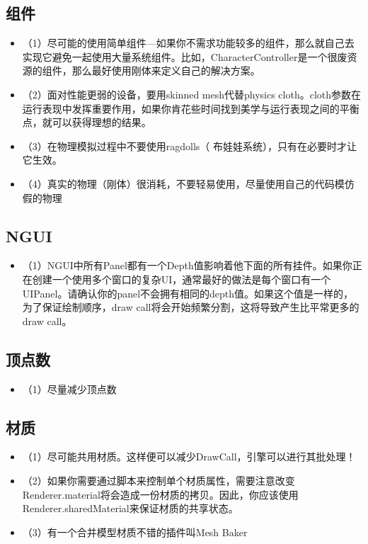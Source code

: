 \documentclass[9pt, b5paper]{article}
\begin{document}
\subsection{组件}
\label{sec:orgb42a9dc}
\begin{itemize}
\item （1）尽可能的使用简单组件—如果你不需求功能较多的组件，那么就自己去实现它避免一起使用大量系统组件。比如，CharacterController是一个很废资源的组件，那么最好使用刚体来定义自己的解决方案。
\item （2）面对性能更弱的设备，要用skinned mesh代替physics cloth。cloth参数在运行表现中发挥重要作用，如果你肯花些时间找到美学与运行表现之间的平衡点，就可以获得理想的结果。
\item （3）在物理模拟过程中不要使用ragdolls（ 布娃娃系统），只有在必要时才让它生效。
\item （4）真实的物理（刚体）很消耗，不要轻易使用，尽量使用自己的代码模仿假的物理
\end{itemize}
\subsection{NGUI}
\label{sec:org77c7aa5}
\begin{itemize}
\item （1）NGUI中所有Panel都有一个Depth值影响着他下面的所有挂件。如果你正在创建一个使用多个窗口的复杂UI，通常最好的做法是每个窗口有一个UIPanel。请确认你的panel不会拥有相同的depth值。如果这个值是一样的，为了保证绘制顺序，draw call将会开始频繁分割，这将导致产生比平常更多的draw call。
\end{itemize}
\subsection{顶点数}
\label{sec:orga6e4d55}
\begin{itemize}
\item （1）尽量减少顶点数
\end{itemize}
\subsection{材质}
\label{sec:org7c0f710}
\begin{itemize}
\item （1）尽可能共用材质。这样便可以减少DrawCall，引擎可以进行其批处理！
\item （2）如果你需要通过脚本来控制单个材质属性，需要注意改变Renderer.material将会造成一份材质的拷贝。因此，你应该使用Renderer.sharedMaterial来保证材质的共享状态。
\item （3）有一个合并模型材质不错的插件叫Mesh Baker
\end{itemize}
\end{document}
